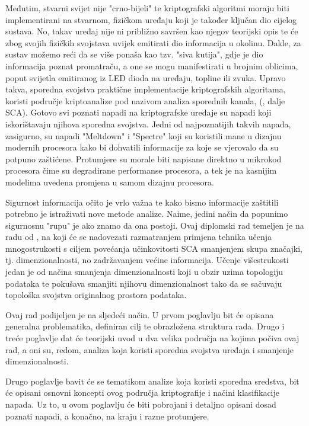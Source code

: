 \documentclass[times, utf8, diplomski]{fer}
\begin{document}
Međutim, stvarni svijet nije "crno-bijeli" te kriptografski algoritmi moraju biti implementirani na stvarnom, fizičkom uređaju koji je također ključan dio cijelog sustava. No, takav uređaj nije ni približno savršen kao njegov teorijski opis te će zbog svojih fizičkih svojstava uvijek emitirati dio informacija u okolinu. Dakle, za sustav možemo reći da se više ponaša kao tzv. "siva kutija", gdje je dio informacija poznat promatraču, a one se mogu manifestirati u brojnim oblicima, poput svijetla emitiranog iz LED dioda na uređaju, topline ili zvuka. Upravo takva, sporedna svojstva praktične implementacije kriptografskih algoritama, koristi područje kriptoanalize pod nazivom analiza sporednih kanala, (, dalje SCA). Gotovo svi poznati napadi na kriptografske uređaje su napadi koji iskorištavaju njihova sporedna svojstva. Jedni od najpoznatijih takvih napada, zasigurno, su napadi "Meltdown" \citep{Lipp2018meltdown} i "Spectre" \citep{Kocher2018spectre} koji su koristili mane u dizajnu modernih procesora kako bi dohvatili informacije za koje se vjerovalo da su potpuno zaštićene. Protumjere su morale biti napisane direktno u mikrokod procesora čime su degradirane performanse procesora, a tek je na kasnijim modelima uvedena promjena u samom dizajnu procesora.

\medskip
Sigurnost informacija očito je vrlo važna te kako bismo informacije zaštitili potrebno je istraživati nove metode analize. Naime, jedini način da popunimo sigurnosnu "rupu" je ako znamo da ona postoji. Ovaj diplomski rad temeljen je na radu od \cite{8836108}, na koji će se nadovezati razmatranjem primjena tehnika učenja mnogostrukosti  s ciljem povećanja učinkovitosti SCA smanjenjem skupa značajki, tj. dimenzionalnosti, no zadržavanjem većine informacija. Učenje višestrukosti jedan je od načina smanjenja dimenzionalnosti koji u obzir uzima topologiju podataka te pokušava smanjiti njihovu dimenzionalnost tako da se sačuvaju topološka svojstva originalnog prostora podataka.

\bigskip
Ovaj rad podijeljen je na sljedeći način. U prvom poglavlju bit će opisana generalna problematika, definiran cilj te obrazložena struktura rada. Drugo i treće poglavlje dat će teorijski uvod u dva velika područja na kojima počiva ovaj rad, a oni su, redom, analiza koja koristi sporedna svojstva uređaja i smanjenje dimenzionalnosti.

Drugo poglavlje bavit će se tematikom analize koja koristi sporedna sredstva, bit će opisani osnovni koncepti ovog područja kriptografije i načini klasifikacije napada. Uz to, u ovom poglavlju će biti pobrojani i detaljno opisani dosad poznati napadi, a konačno, na kraju i razne protumjere.
\end{document}
